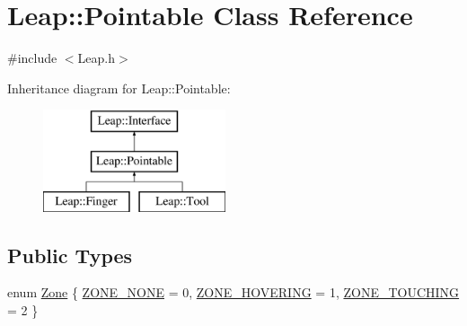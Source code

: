 \hypertarget{class_leap_1_1_pointable}{\section{Leap\+:\+:Pointable Class Reference}
\label{class_leap_1_1_pointable}
}


{\ttfamily \#include $<$Leap.\+h$>$}

Inheritance diagram for Leap\+:\+:Pointable\+:\begin{figure}[H]
\begin{center}
\leavevmode
\includegraphics[height=3.000000cm]{class_leap_1_1_pointable}
\end{center}
\end{figure}
\subsection*{Public Types}
\begin{DoxyCompactItemize}
\item 
enum \hyperlink{class_leap_1_1_pointable_ad6e50b9878b8c1fdf899b5e09721deef}{Zone} \{ \hyperlink{class_leap_1_1_pointable_ad6e50b9878b8c1fdf899b5e09721deefa4c1e87f878b5a0a3d1ac4903f92e29fe}{Z\+O\+N\+E\+\_\+\+N\+O\+N\+E} = 0, 
\hyperlink{class_leap_1_1_pointable_ad6e50b9878b8c1fdf899b5e09721deefad8f42b8833b8233e2b196863b5937f3c}{Z\+O\+N\+E\+\_\+\+H\+O\+V\+E\+R\+I\+N\+G} = 1, 
\hyperlink{class_leap_1_1_pointable_ad6e50b9878b8c1fdf899b5e09721deefa9ccf7859ad8c4f411779d04fbdb23e23}{Z\+O\+N\+E\+\_\+\+T\+O\+U\+C\+H\+I\+N\+G} = 2
 \}
\end{DoxyCompactItemize}
